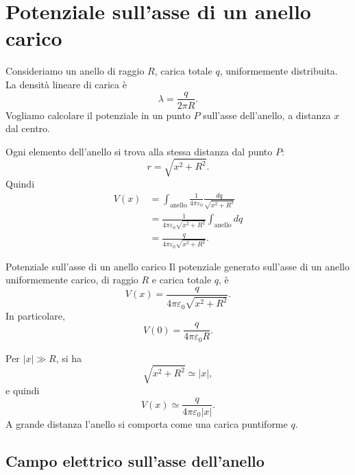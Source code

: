 \documentclass[a4paper]{article}
\begin{document}
\section{Potenziale sull'asse di un anello carico}

Consideriamo un anello di raggio \(R\), carica totale \(q\), uniformemente distribuita. La densità lineare di carica è
\[
    \lambda=\frac{q}{2\pi R}.
\]
Vogliamo calcolare il potenziale in un punto \(P\) sull'asse dell'anello, a distanza \(x\) dal centro.

\begin{center}
\end{center}

Ogni elemento dell'anello si trova alla stessa distanza dal punto \(P\):
\[
    r=\sqrt{x^2+R^2}.
\]
Quindi
\begin{align*}
    V(x)
    &=\int_{\text{anello}} \frac{1}{4\pi\varepsilon_0}\frac{dq}{\sqrt{x^2+R^2}} \\
    &=\frac{1}{4\pi\varepsilon_0\sqrt{x^2+R^2}}\int_{\text{anello}}dq \\
    &=\frac{q}{4\pi\varepsilon_0\sqrt{x^2+R^2}}.
\end{align*}

\begin{snippettheorem}{Potenziale sull'asse di un anello carico}
    Il potenziale generato sull'asse di un anello uniformemente carico, di raggio \(R\) e carica totale \(q\), è
    \[
        V(x)=\frac{q}{4\pi\varepsilon_0\sqrt{x^2+R^2}}.
    \]
    In particolare,
    \[
        V(0)=\frac{q}{4\pi\varepsilon_0R}.
    \]
\end{snippettheorem}

Per \(|x|\gg R\), si ha
\[
    \sqrt{x^2+R^2}\simeq |x|,
\]
e quindi
\[
    V(x)\simeq \frac{q}{4\pi\varepsilon_0|x|}.
\]
A grande distanza l'anello si comporta come una carica puntiforme \(q\).

\subsection{Campo elettrico sull'asse dell'anello}
\end{document}
